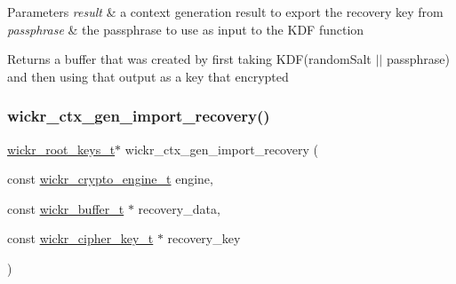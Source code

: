 \begin{DoxyParams}{Parameters}
{\em result} & a context generation result to export the recovery key from \\
\hline
{\em passphrase} & the passphrase to use as input to the K\+DF function \\
\hline
\end{DoxyParams}
\begin{DoxyReturn}{Returns}
a buffer that was created by first taking K\+DF(random\+Salt $\vert$$\vert$ passphrase) and then using that output as a key that encrypted 
\end{DoxyReturn}
\mbox{\label{group__wickr__ctx_ga0bde95494141673604b9e4e1f7954e2c}} 
\subsubsection{\texorpdfstring{wickr\+\_\+ctx\+\_\+gen\+\_\+import\+\_\+recovery()}{wickr\_ctx\_gen\_import\_recovery()}}
{\footnotesize\ttfamily \hyperlink{structwickr__root__keys}{wickr\+\_\+root\+\_\+keys\+\_\+t}$\ast$ wickr\+\_\+ctx\+\_\+gen\+\_\+import\+\_\+recovery (\begin{DoxyParamCaption}\item[{const \hyperlink{structwickr__crypto__engine}{wickr\+\_\+crypto\+\_\+engine\+\_\+t}}]{engine,  }\item[{const \hyperlink{structwickr__buffer}{wickr\+\_\+buffer\+\_\+t} $\ast$}]{recovery\+\_\+data,  }\item[{const \hyperlink{structwickr__cipher__key}{wickr\+\_\+cipher\+\_\+key\+\_\+t} $\ast$}]{recovery\+\_\+key }\end{DoxyParamCaption})}


